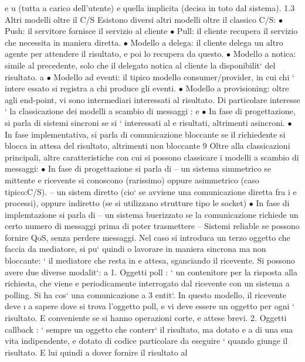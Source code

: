 \documentclass[a4paper,12pt]{article}
\begin{document}
e
u
(tutta a carico dell'utente) e quella implicita (decisa in toto dal sistema).
1.3
Altri modelli oltre il C/S
Esistono diversi altri modelli oltre il classico C/S:
$\bullet$ Push: il servitore fornisce il servizio al cliente
$\bullet$ Pull: il cliente recupera il servizio che necessita in maniera diretta.
$\bullet$ Modello a delega: il cliente delega un altro agente per attendere il risultato,
e poi lo recupera da questo.
$\bullet$ Modello a notica: simile al precedente, solo che il delegato notica al
cliente la disponibilit` del risultato.
a
$\bullet$ Modello ad eventi: il tipico modello consumer/provider, in cui chi ` intere
essato si registra a chi produce gli eventi.
$\bullet$ Modello a provisioning: oltre agli end-point, vi sono intermediari interessati al risultato.
Di particolare interesse ` la classicazione dei modelli a scambio di messaggi :
e
$\bullet$ In fase di progettazione, si parla di sistemi sincroni se si ` interessati al
e
risultati, altrimenti asincroni.
$\bullet$ In fase implementativa, si parla di comunicazione bloccante se il richiedente
si blocca in attesa del risultato, altrimenti non bloccante
9
\newpage
Oltre alla classicazioni principali, altre caratteristiche con cui si possono classicare i modelli a scambio di
messaggi:
$\bullet$ In fase di progettazione si parla di
-- un sistema simmetrico se mittente e ricevente si conoscono (rarissimo) oppure asimmetrico (caso tipico:C/S).
-- un sistem diretto (cio` se avviene una comunicazione diretta fra i
e
processi), oppure indiretto (se si utilizzano strutture tipo le socket)
$\bullet$ In fase di implemtazione si parla di
-- un sistema buerizzato se la comunicazione richiede un certo numero
di messaggi prima di poter trasmettere
-- Sistemi reliable se possono fornire QoS, senza perdere messaggi.
Nel caso si introduca un terzo oggetto che faccia da mediatore, si pu` quindi
o
lavorare in maniera sincrona ma non bloccante: ` il mediatore che resta in
e
attesa, sganciando il ricevente. Si possono avere due diverse modalit`:
a
1. Oggetti poll : ` un contenitore per la risposta alla richiesta, che viene
e
periodicamente interrogato dal ricevente con un sistema a polling. Si ha
cos` una comunicazione a 3 entit`. In questo modello, il ricevente deve
\i{}
a
sapere dove si trova l'oggetto poll, e vi deve essere un oggetto per ogni
`
risultato. E conveniente se si hanno operazioni corte, e attese brevi.
2. Oggetti callback : ` sempre un oggetto che conterr` il risultato, ma dotato
e
a
di una sua vita indipendente, e dotato di codice particolare da eseguire
`
quando giunge il risultato. E lui quindi a dover fornire il risultato al
\end{document}

